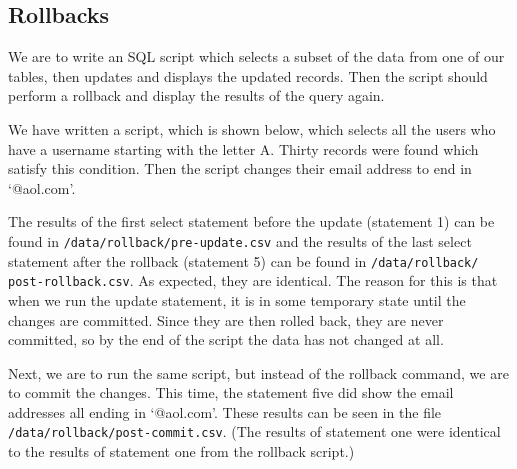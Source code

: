 \subsection{Rollbacks}

We are to write an SQL script which selects a subset of the data from one of our tables, then updates and displays the updated records. Then the script should perform a rollback and display the results of the query again.

We have written a script, which is shown below, which selects all the users who have a username starting with the letter A. Thirty records were found which satisfy this condition. Then the script changes their email address to end in `@aol.com'.


The results of the first select statement before the update (statement 1) can be found in \verb`/data/rollback/pre-update.csv` and the results of the last select statement after the rollback (statement 5) can be found in \verb`/data/rollback/` \verb`post-rollback.csv`. As expected, they are identical. The reason for this is that when we run the update statement, it is in some temporary state until the changes are committed. Since they are then rolled back, they are never committed, so by the end of the script the data has not changed at all.

Next, we are to run the same script, but instead of the rollback command, we are to commit the changes. This time, the statement five did show the email addresses all ending in `@aol.com'. These results can be seen in the file \verb`/data/rollback/post-commit.csv`. (The results of statement one were identical to the results of statement one from the rollback script.) %
